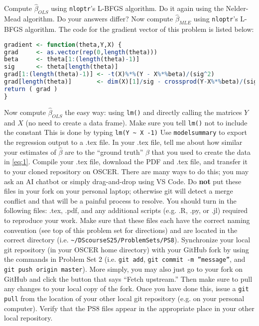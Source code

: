 \documentclass[12pt,english]{exam}
\begin{document}
\begin{questions}
\question Compute $\hat{\beta}_{OLS}$ using \texttt{nloptr}'s L-BFGS algorithm. Do it again using the Nelder-Mead algorithm. Do your answers differ?
\question Now compute $\hat{\beta}_{MLE}$ using \texttt{nloptr}'s L-BFGS algorithm. The code for the gradient vector of this problem is listed below:
\begin{lstlisting}[language=R]
gradient <- function(theta,Y,X) {
grad     <- as.vector(rep(0,length(theta)))
beta     <- theta[1:(length(theta)-1)]
sig      <- theta[length(theta)]
grad[1:(length(theta)-1)] <- -t(X)%*%(Y - X%*%beta)/(sig^2)
grad[length(theta)]       <- dim(X)[1]/sig - crossprod(Y-X%*%beta)/(sig^3)
return ( grad )
}
\end{lstlisting}
\question Now compute $\hat{\beta}_{OLS}$ the easy way: using \texttt{lm()} and directly calling the matrices $Y$ and $X$ (no need to create a data frame). Make sure you tell \texttt{lm()} not to include the constant This is done by typing \texttt{lm(Y \textasciitilde{} X -1)}
Use \texttt{modelsummary} to export the regression output to a .tex file. In your .tex file, tell me about how similar your estimates of $\hat{\beta}$ are to the ``ground truth'' $\beta$ that you used to create the data in \eqref{eq:1}.
\question Compile your .tex file, download the PDF and .tex file, and transfer it to your cloned repository on OSCER. There are many ways to do this;  you may ask an AI chatbot or simply drag-and-drop using VS Code. Do \textbf{not} put these files in your fork on your personal laptop; otherwise git will detect a merge conflict and that will be a painful process to resolve.
\question You should turn in the following files: .tex, .pdf, and any additional scripts (e.g. .R, .py, or .jl) required to reproduce your work.  Make sure that these files each have the correct naming convention (see top of this problem set for directions) and are located in the correct directory (i.e. \texttt{\textasciitilde/DScourseS25/ProblemSets/PS8}).
\question Synchronize your local git repository (in your OSCER home directory) with your GitHub fork by using the commands in Problem Set 2 (i.e. \texttt{git add}, \texttt{git commit -m ''message''}, and \texttt{git push origin master}). More simply, you may also just go to your fork on GitHub and click the button that says ``Fetch upstream.'' Then make sure to pull any changes to your local copy of the fork. Once you have done this, issue a \texttt{git pull} from the location of your other local git repository (e.g. on your personal computer). Verify that the PS8 files appear in the appropriate place in your other local repository.
\end{questions}
\end{document}
